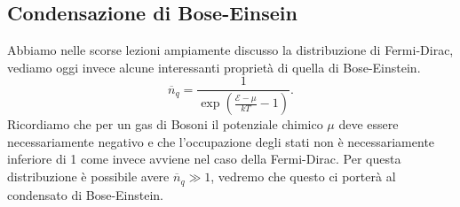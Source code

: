 \subsection{Condensazione di Bose-Einsein}%
Abbiamo nelle scorse lezioni ampiamente discusso la distribuzione di Fermi-Dirac, vediamo oggi invece alcune interessanti proprietà di quella di Bose-Einstein.
\[
	\overline{n}_{q} = \frac{1}{\exp\left( \frac{\mathcal{E} - \mu }{kT}-1 \right) }
.\]
Ricordiamo che per un gas di Bosoni il potenziale chimico $\mu $ deve essere necessariamente negativo e che l'occupazione degli stati non è necessariamente inferiore di 1 come invece avviene nel caso della Fermi-Dirac. Per questa distribuzione è possibile avere $\overline{n}_{q} \gg 1$, vedremo che questo ci porterà al condensato di Bose-Einstein.\\
